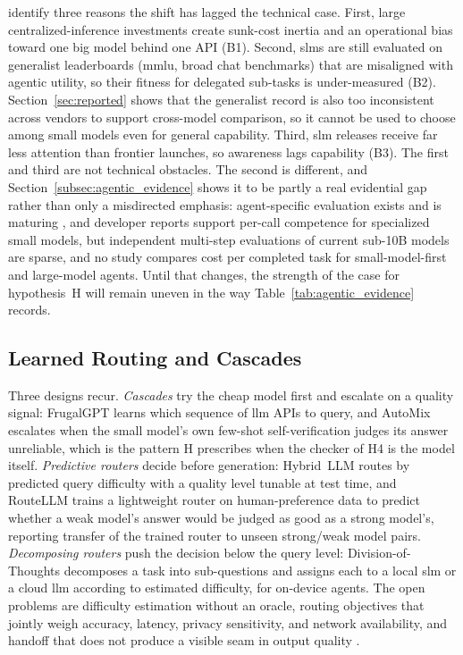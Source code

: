 \citet{belcak2025slm_agentic} identify three reasons the shift has lagged the technical case. First, large centralized-inference investments create sunk-cost inertia and an operational bias toward one big model behind one API (B1). Second, \glspl{slm} are still evaluated on generalist leaderboards (\gls{mmlu}, broad chat benchmarks) that are misaligned with agentic utility, so their fitness for delegated sub-tasks is under-measured (B2). Section~\ref{sec:reported} shows that the generalist record is also too inconsistent across vendors to support cross-model comparison, so it cannot be used to choose among small models even for general capability. Third, \gls{slm} releases receive far less attention than frontier launches, so awareness lags capability (B3). The first and third are not technical obstacles. The second is different, and Section~\ref{subsec:agentic_evidence} shows it to be partly a real evidential gap rather than only a misdirected emphasis: agent-specific evaluation exists and is maturing \citep{patil2025bfcl,yao2024taubench,barres2025tau2,liu2024agentbench,kapoor2025hal}, and developer reports support per-call competence for specialized small models, but independent multi-step evaluations of current sub-10B models are sparse, and no study compares cost per completed task for small-model-first and large-model agents. Until that changes, the strength of the case for hypothesis~H will remain uneven in the way Table~\ref{tab:agentic_evidence} records.

\subsection{Learned Routing and Cascades}
\label{subsubsec:agentic_routing}

Three designs recur. \emph{Cascades} try the cheap model first and escalate on a quality signal: FrugalGPT \citep{chen2023frugalgpt} learns which sequence of \gls{llm} APIs to query, and AutoMix \citep{aggarwal2024automix} escalates when the small model's own few-shot self-verification judges its answer unreliable, which is the pattern H prescribes when the checker of H4 is the model itself. \emph{Predictive routers} decide before generation: Hybrid~LLM \citep{ding2024hybridllm} routes by predicted query difficulty with a quality level tunable at test time, and RouteLLM \citep{ong2024routellm} trains a lightweight router on human-preference data to predict whether a weak model's answer would be judged as good as a strong model's, reporting transfer of the trained router to unseen strong/weak model pairs. \emph{Decomposing routers} push the decision below the query level: Division-of-Thoughts \citep{division_of_thoughts_2025} decomposes a task into sub-questions and assigns each to a local \gls{slm} or a cloud \gls{llm} according to estimated difficulty, for on-device agents. The open problems are difficulty estimation without an oracle, routing objectives that jointly weigh accuracy, latency, privacy sensitivity, and network availability, and handoff that does not produce a visible seam in output quality \citep{demystifying2025slm}.

